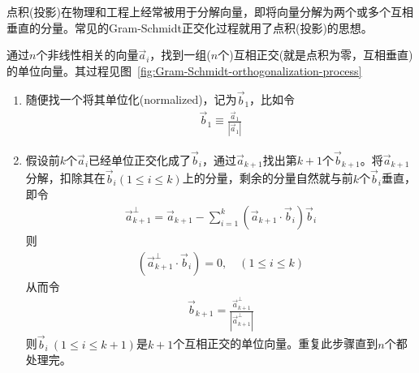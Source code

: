 \begin{example}
  点积(投影)在物理和工程上经常被用于分解向量，即将向量分解为两个或多个互相垂直的分量。常见的Gram-Schmidt正交化过程就用了点积(投影)的思想。


  通过$n$个非线性相关的向量$\vec a_i$，找到一组($n$个)互相正交(就是点积为零，互相垂直)的单位向量。其过程见图~\ref{fig:Gram-Schmidt-orthogonalization-process}
  \begin{enumerate}
  \item 随便找一个将其单位化(normalized)，记为$\vec b_1$，比如令
    \begin{align*}
      \vec b_1\equiv \frac{\vec a_1}{|\vec a_1|}
    \end{align*}

  \item 假设前$k$个$\vec a_i$已经单位正交化成了$\vec b_i$，通过$\vec a_{k+1}$找出第$k+1$个$\vec b_{k+1}$。将$\vec a_{k+1}$分解，扣除其在$\vec b_i(1\le i\le k)$上的分量，剩余的分量自然就与前$k$个$\vec b_i$垂直，即令
    \begin{align*}
      \vec a_{k+1}^\perp = \vec a_{k+1} - \sum_{i=1}^k (\vec a_{k+1}\cdot\vec b_i)\vec b_i
    \end{align*}
    则
    \begin{align*}
      (\vec a_{k+1}^\perp \cdot \vec b_i) = 0, \quad(1\le i\le k)
    \end{align*}
    从而令
    \begin{align*}
      \vec b_{k+1} = \frac{\vec a_{k+1}^\perp}{|\vec a_{k+1}^\perp|}
    \end{align*}
    则$\vec b_i\ (1\le i\le k+1)$是$k+1$个互相正交的单位向量。重复此步骤直到$n$个都处理完。
  \end{enumerate}


\end{example}
